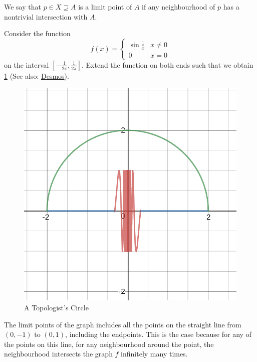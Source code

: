 \documentclass[notoc,notitlepage]{tufte-book}
\begin{document}
\begin{defn}\label{defn:limit_point}
  We say that $p \in X \supseteq A$ is a limit point of $A$
  if any neighbourhood of $p$ has a nontrivial intersection
  with $A$.
\end{defn}

\begin{eg}\label{eg:a_topologists_circle}
  Consider the function
  \begin{equation*}
    f(x) = \begin{cases}
      \sin \frac{1}{x} & x \neq 0 \\
      0                & x = 0
    \end{cases}
  \end{equation*}
  on the interval $\left[ -\frac{1}{2 \pi}, \frac{1}{2 \pi} \right]$.
  Extend the function on both ends such that we obtain \cref{fig:a_topologists_circle}
  (See also: \href{https://www.desmos.com/calculator/figksl5wmv}{Desmos}).
  \begin{figure}[ht]
    \centering
    \includegraphics[width=0.7\linewidth]{topologists-circle.png}
    \caption{A Topologist's Circle}
    \label{fig:a_topologists_circle}
  \end{figure}

  The limit points of the graph includes all the points
  on the straight line from $(0, -1)$ to $(0, 1)$, including the endpoints.
  This is the case because for any of the points on this line, for any
  neighbourhood around the point, the neighbourhood intersects the
  graph $f$ infinitely many times.
\end{eg}
\end{document}
